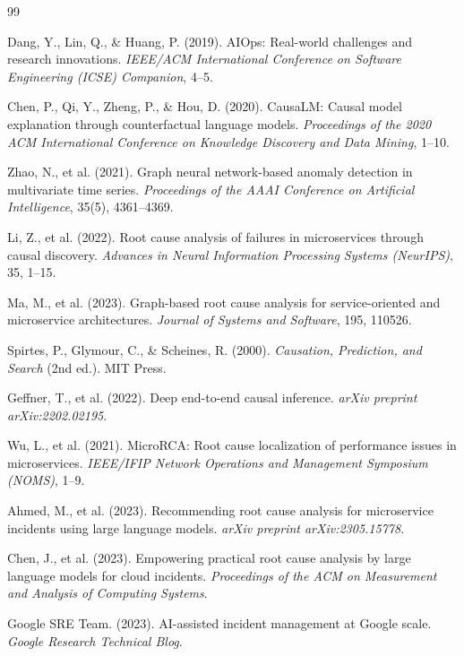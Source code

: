 \begin{thebibliography}{99}

Dang, Y., Lin, Q., \& Huang, P. (2019). AIOps: Real-world challenges and research innovations. \textit{IEEE/ACM International Conference on Software Engineering (ICSE) Companion}, 4--5.

Chen, P., Qi, Y., Zheng, P., \& Hou, D. (2020). CausaLM: Causal model explanation through counterfactual language models. \textit{Proceedings of the 2020 ACM International Conference on Knowledge Discovery and Data Mining}, 1--10.

Zhao, N., et al. (2021). Graph neural network-based anomaly detection in multivariate time series. \textit{Proceedings of the AAAI Conference on Artificial Intelligence}, 35(5), 4361--4369.

Li, Z., et al. (2022). Root cause analysis of failures in microservices through causal discovery. \textit{Advances in Neural Information Processing Systems (NeurIPS)}, 35, 1--15.

Ma, M., et al. (2023). Graph-based root cause analysis for service-oriented and microservice architectures. \textit{Journal of Systems and Software}, 195, 110526.

Spirtes, P., Glymour, C., \& Scheines, R. (2000). \textit{Causation, Prediction, and Search} (2nd ed.). MIT Press.

Geffner, T., et al. (2022). Deep end-to-end causal inference. \textit{arXiv preprint arXiv:2202.02195}.

Wu, L., et al. (2021). MicroRCA: Root cause localization of performance issues in microservices. \textit{IEEE/IFIP Network Operations and Management Symposium (NOMS)}, 1--9.

Ahmed, M., et al. (2023). Recommending root cause analysis for microservice incidents using large language models. \textit{arXiv preprint arXiv:2305.15778}.

Chen, J., et al. (2023). Empowering practical root cause analysis by large language models for cloud incidents. \textit{Proceedings of the ACM on Measurement and Analysis of Computing Systems}.

Google SRE Team. (2023). AI-assisted incident management at Google scale. \textit{Google Research Technical Blog}.


\end{thebibliography}
